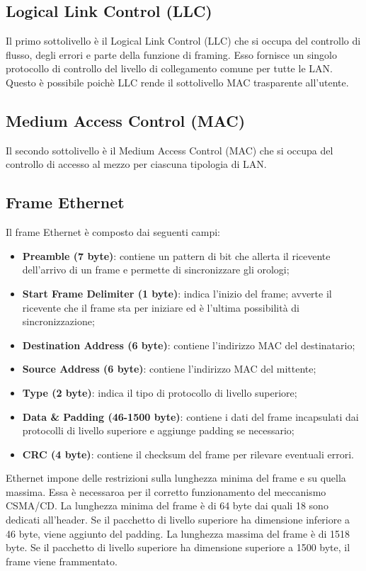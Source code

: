 \documentclass[12pt]{report}
\begin{document}
\subsection{Logical Link Control (LLC)}
Il primo sottolivello è il Logical Link Control (LLC) che si occupa del controllo di flusso, degli errori e parte della funzione di framing. Esso fornisce un singolo protocollo di controllo del livello di collegamento comune per tutte le LAN. Questo è possibile poichè LLC rende il sottolivello MAC trasparente all'utente.

\subsection{Medium Access Control (MAC)}
Il secondo sottolivello è il Medium Access Control (MAC) che si occupa del controllo di accesso al mezzo per ciascuna tipologia di LAN.

\subsection{Frame Ethernet}
Il frame Ethernet è composto dai seguenti campi:
\begin{itemize}
	\item \textbf{Preamble (7 byte)}: contiene un pattern di bit che allerta il ricevente dell'arrivo di un frame e permette di sincronizzare gli orologi;
	\item \textbf{Start Frame Delimiter (1 byte)}: indica l'inizio del frame; avverte il ricevente che il frame sta per iniziare ed è l'ultima possibilità di sincronizzazione;
	\item \textbf{Destination Address (6 byte)}: contiene l'indirizzo MAC del destinatario;
	\item \textbf{Source Address (6 byte)}: contiene l'indirizzo MAC del mittente;
	\item \textbf{Type (2 byte)}: indica il tipo di protocollo di livello superiore;
	\item \textbf{Data \& Padding (46-1500 byte)}: contiene i dati del frame incapsulati dai protocolli di livello superiore e aggiunge padding se necessario;
	\item \textbf{CRC (4 byte)}: contiene il checksum del frame per rilevare eventuali errori.
\end{itemize}
Ethernet impone delle restrizioni sulla lunghezza minima del frame e su quella massima. Essa è necessaroa per il corretto funzionamento del meccanismo CSMA/CD. La lunghezza minima del frame è di 64 byte dai quali 18 sono dedicati all'header. Se il pacchetto di livello superiore ha dimensione inferiore a 46 byte, viene aggiunto del padding. La lunghezza massima del frame è di 1518 byte. Se il pacchetto di livello superiore ha dimensione superiore a 1500 byte, il frame viene frammentato.
\end{document}
